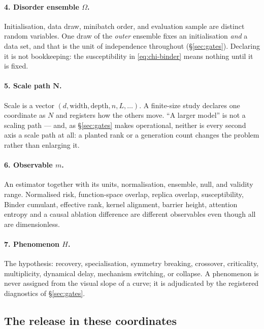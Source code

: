 \paragraph{4. Disorder ensemble $\Omega$.}
Initialisation, data draw, minibatch order, and evaluation sample are distinct
random variables. One draw of the \emph{outer} ensemble fixes an initialisation
\emph{and} a data set, and that is the unit of independence throughout
(\S\ref{sec:gates}). Declaring it is not bookkeeping: the susceptibility in
\eqref{eq:chi-binder} means nothing until it is fixed.

\paragraph{5. Scale path $\mathbf N$.}
Scale is a vector $(d,\text{width},\text{depth},n,L,\ldots)$. A finite-size
study declares one coordinate as $N$ and registers how the others move.
``A larger model'' is not a scaling path --- and, as \S\ref{sec:gates} makes
operational, neither is every second axis a scale path at all: a planted rank
or a generation count changes the problem rather than enlarging it.

\paragraph{6. Observable $m$.}
An estimator together with its units, normalisation, ensemble, null, and
validity range. Normalised risk, function-space overlap, replica overlap,
susceptibility, Binder cumulant, effective rank, kernel alignment, barrier
height, attention entropy and a causal ablation difference are different
observables even though all are dimensionless.

\paragraph{7. Phenomenon $H$.}
The hypothesis: recovery, specialisation, symmetry breaking, crossover,
criticality, multiplicity, dynamical delay, mechanism switching, or collapse.
A phenomenon is never assigned from the visual slope of a curve; it is
adjudicated by the registered diagnostics of \S\ref{sec:gates}.

\subsection{The release in these coordinates}

